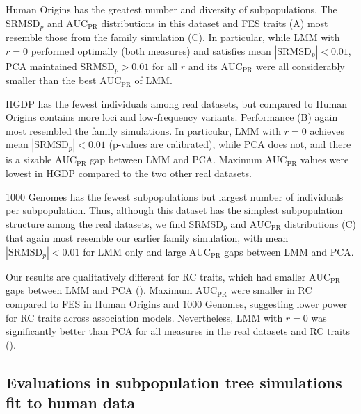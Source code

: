 \documentclass[9pt,lineno]{elife}
\newcommand{\rmsd}{\text{SRMSD}_p}
\newcommand{\auc}{\text{AUC}_\text{PR}}
\begin{document}
\begin{figure}
\begin{fullwidth}
    \label{figsupp:rmsd-auc-real-rc-env}
\end{fullwidth}
\end{figure}

Human Origins has the greatest number and diversity of subpopulations.
The $\rmsd$ and $\auc$ distributions in this dataset and FES traits (A) most resemble those from the family simulation (C).
In particular, while LMM with $r=0$ performed optimally (both measures) and satisfies mean $|\rmsd| < 0.01$, PCA maintained $\rmsd > 0.01$ for all $r$ and its $\auc$ were all considerably smaller than the best $\auc$ of LMM.

HGDP has the fewest individuals among real datasets, but compared to Human Origins contains more loci and low-frequency variants.
Performance (B) again most resembled the family simulations.
In particular, LMM with $r=0$ achieves mean $|\rmsd| < 0.01$ (p-values are calibrated), while PCA does not, and there is a sizable $\auc$ gap between LMM and PCA.
Maximum $\auc$ values were lowest in HGDP compared to the two other real datasets.

1000 Genomes has the fewest subpopulations but largest number of individuals per subpopulation.
Thus, although this dataset has the simplest subpopulation structure among the real datasets, we find $\rmsd$ and $\auc$ distributions (C) that again most resemble our earlier family simulation, with mean $|\rmsd| < 0.01$ for LMM only and large $\auc$ gaps between LMM and PCA.

Our results are qualitatively different for RC traits, which had smaller $\auc$ gaps between LMM and PCA ().
Maximum $\auc$ were smaller in RC compared to FES in Human Origins and 1000 Genomes, suggesting lower power for RC traits across association models.
Nevertheless, LMM with $r=0$ was significantly better than PCA for all measures in the real datasets and RC traits ().

\subsection{Evaluations in subpopulation tree simulations fit to human data}
\end{document}

